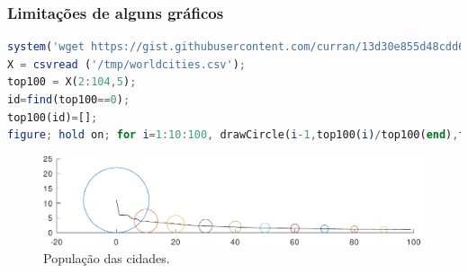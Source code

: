 \begin{frame}
\frametitle{Limitações de alguns gráficos}
\begin{lstlisting}[language=Octave, label=lst-y1y2, caption={Onde as curvas $y_1$ e $y_2$ estão mais próximas e mais distantes?}, postbreak=\mbox{$\hookrightarrow$\space}, basicstyle=\fontsize{8}{10}\selectfont\ttfamily]
system('wget https://gist.githubusercontent.com/curran/13d30e855d48cdd6f22acdf0afe27286/raw/0635f14817ec634833bb904a47594cc2f5f9dbf8/worldcities_clean.csv -O /tmp/worldcities.csv')
X = csvread ('/tmp/worldcities.csv');
top100 = X(2:104,5);
id=find(top100==0);
top100(id)=[];
figure; hold on; for i=1:10:100, drawCircle(i-1,top100(i)/top100(end),top100(i)/top100(end)); end; plot([0:99],top100./top100(end),'k-'); hold off; daspect([1 1 1]);
\end{lstlisting}

\begin{figure}[h]
 \centering
  \includegraphics[width=\textwidth,height=0.5\textheight,keepaspectratio]{figures/citiespop.pdf}
 \caption{População das cidades.}
 \label{fig-citiespop}
\end{figure}

\end{frame}


